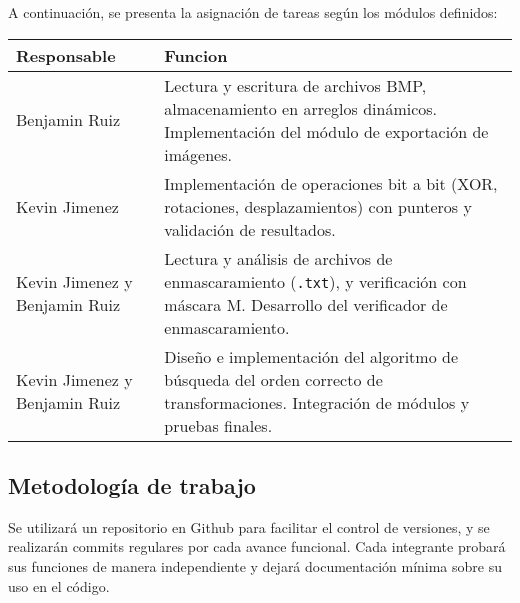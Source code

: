\documentclass[11pt]{article}
\begin{document}
A continuación, se presenta la asignación de tareas según los módulos definidos:

\begin{center}
\begin{tabular}{|l|p{9cm}|}
\hline
\textbf{Responsable} & \textbf{Funcion} \\
\hline
Benjamin Ruiz & Lectura y escritura de archivos BMP, almacenamiento en arreglos dinámicos. Implementación del módulo de exportación de imágenes. \\
\hline
Kevin Jimenez & Implementación de operaciones bit a bit (XOR, rotaciones, desplazamientos) con punteros y validación de resultados. \\
\hline
Kevin Jimenez y Benjamin Ruiz & Lectura y análisis de archivos de enmascaramiento (\texttt{.txt}), y verificación con máscara M. Desarrollo del verificador de enmascaramiento. \\
\hline
Kevin Jimenez y Benjamin Ruiz & Diseño e implementación del algoritmo de búsqueda del orden correcto de transformaciones. Integración de módulos y pruebas finales. \\
\hline
\end{tabular}
\end{center}

\subsection*{Metodología de trabajo}

Se utilizará un repositorio en Github para facilitar el control de versiones, y se realizarán commits regulares por cada avance funcional. Cada integrante probará sus funciones de manera independiente y dejará documentación mínima sobre su uso en el código.
\end{document}

